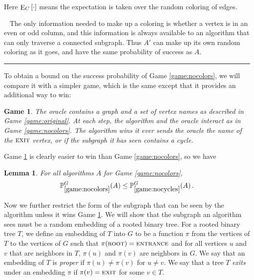 \documentclass[aps,11pt,twoside,nofootinbib,tightenlines,superscriptaddress,preprintnumbers]{revtex4}
\newcommand{\<}{\langle}
\renewcommand{\>}{\rangle}
\newcommand{\be}{\begin{equation}}
\newcommand{\ee}{\end{equation}}
\newcommand{\ent}{{\textsc{entrance}}}
\newcommand{\exit}{{\textsc{exit}}}
\renewcommand{\root}{{\textsc{root}}}
\newcommand\symExpec{\mathop{\mathrm{E}}\displaylimits}
\def\expec#1#2{\symExpec_{#1}\left[ #2 \right]}
\newtheorem{lemma}[theorem]{Lemma}
\newtheorem{game}{Game}
\newcommand{\qed}{\rule{7pt}{7pt}}
\newenvironment{proof}
  {\trivlist\item\noindent{\bf Proof}~}
  {\qed\endtrivlist}
\begin{document}
\noindent
Here $\expec{C}{\cdot}$ means the expectation is taken over the random
coloring of edges.

\begin{proof}
The only information needed to make up a coloring is whether a
vertex is in an even or odd column, and this information is always
available to an algorithm that can only traverse a connected subgraph.
Thus $A'$ can make up its own random coloring as it goes, and have the 
same probability of success as $A$.
\end{proof}

To obtain a bound on the success probability of Game \ref{game:nocolors},
we will compare it with a simpler game, which is the same except that it
provides an additional way to win:

\begin{game}\label{game:nocycles}
  The oracle contains a graph and a set of vertex names as described in
  Game \ref{game:original}.
%
  At each step, the algorithm and the oracle interact as in Game
  \ref{game:nocolors}.
%
  The algorithm wins it ever sends the oracle the name of the $\exit$
  vertex, or if the subgraph it has seen contains a cycle.
\end{game}

\noindent
Game \ref{game:nocycles} is clearly easier to win than Game
\ref{game:nocolors}, so we have

\begin{lemma}
For all algorithms $A$ for Game \ref{game:nocolors},
\be
      \mathbb{P}_{\ref{game:nocolors}}^{G}(A) 
  \le \mathbb{P}_{\ref{game:nocycles}}^{G}(A)
\,.
\ee
\end{lemma}

Now we further restrict the form of the subgraph that can be seen by the
algorithm unless it wins Game \ref{game:nocycles}.  
We will show that the subgraph an algorithm sees must be a
random embedding of a rooted binary tree.  For a rooted binary tree $T$,
we define an embedding of $T$ into $G$ to be a function $\pi$ from the
vertices of $T$ to the vertices of $G$ such that $\pi(\root) = \ent$ and
for all vertices $u$ and $v$ that are neighbors in $T$, $\pi(u)$ and
$\pi(v)$ are neighbors in $G$.  We say that an embedding of $T$ is {\em
proper} if $\pi(u) \not = \pi(v)$ for $u \ne v$.  We say that a tree $T$
{\em exits} under an embedding $\pi$ if $\pi(v) = \exit$ for some $v \in
T$.
\end{document}
